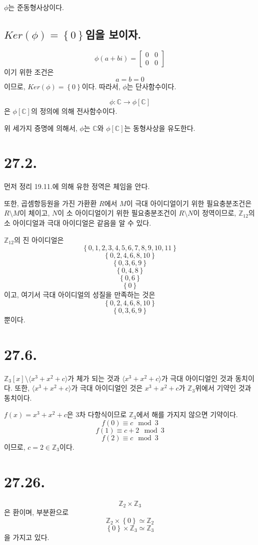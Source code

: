 \documentclass{article}
\begin{document}
$\phi$는 준동형사상이다. 

\subsection{$Ker(\phi) = \left\{0\right\}$임을 보이자.}
$$\phi(a+bi) = \begin{bmatrix}
0& 0 \\ 
0 &0 
\end{bmatrix}$$이기 위한 조건은
$$a = b = 0$$이므로, 
$Ker(\phi) = \left\{0\right\}$이다. 따라서, $\phi$는 단사함수이다.

$$\phi : \mathbb{C} \rightarrow \phi[\mathbb{C}]$$은 $\phi[\mathbb{C}]$의 정의에 의해 전사함수이다.

위 세가지 증명에 의해서, $\phi$는 $\mathbb{C}$와 $\phi[\mathbb{C}]$는 동형사상을 유도한다.


\section{27.2.}
먼저 정리 19.11.에 의해 유한 정역은 체임을 안다.

또한, 곱셈항등원을 가진 가환환 $R$에서 $M$이 극대 아이디얼이기 위한 필요충분조건은 $R\setminus M$이 체이고, $N$이 소 아이디얼이기 위한 필요충분조건이 $R\setminus N$이 정역이므로, $\mathbb{Z}_{12}$의 소 아이디얼과 극대 아이디얼은 같음을 알 수 있다.

$\mathbb{Z}_{12}$의 진 아이디얼은
$$\left\{0, 1, 2, 3, 4, 5, 6, 7, 8, 9, 10, 11\right\}$$
$$\left\{0, 2, 4, 6, 8, 10\right\}$$
$$\left\{0, 3, 6, 9\right\}$$
$$\left\{0, 4, 8\right\}$$
$$\left\{0, 6\right\}$$
$$\left\{0\right\}$$
이고, 여기서 극대 아이디얼의 성질을 만족하는 것은
$$\left\{0, 2, 4, 6, 8, 10\right\}$$
$$\left\{0, 3, 6, 9\right\}$$
뿐이다.

\section{27.6.}
$\mathbb{Z}_3 [x] \setminus \langle x^3 + x^2 + c \rangle$가 체가 되는 것과 $\langle x^3 + x^2 + c \rangle$가 극대 아이디얼인 것과 동치이다. 또한, $\langle x^3 + x^2 + c \rangle$가 극대 아이디얼인 것은 $x^3 + x^2 + c$가 $\mathbb{Z}_3$위에서 기약인 것과 동치이다.

$f(x) = x^3 + x^2 + c$은 3차 다항식이므로 $\mathbb{Z}_3$에서 해를 가지지 않으면 기약이다.
$$f(0) \equiv c \mod 3$$
$$f(1) \equiv c+2 \mod 3$$
$$f(2) \equiv c \mod 3$$
이므로, $c = 2 \in \mathbb{Z}_3$이다.


\section{27.26.}
$$\mathbb{Z}_2 \times \mathbb{Z}_3$$
은 환이며, 부분환으로
$$\mathbb{Z}_2 \times \left\{0\right\} \simeq \mathbb{Z}_2$$
$$\left\{0\right\} \times \mathbb{Z}_3 \simeq \mathbb{Z}_3$$
을 가지고 있다.
\end{document}
